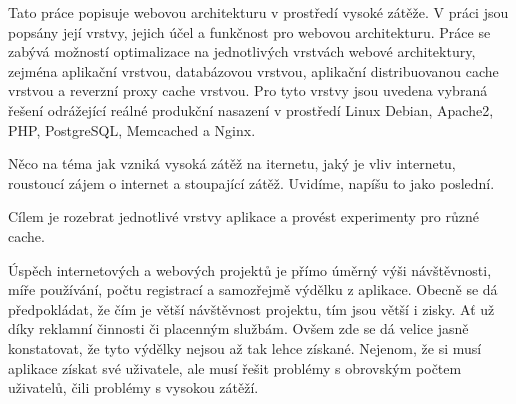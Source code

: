 \documentclass[12pt]{article}
\begin{document}



{Tato práce popisuje webovou architekturu v prostředí vysoké zátěže. V práci jsou popsány její vrstvy, jejich účel a funkčnost pro webovou architekturu. Práce se zabývá možností optimalizace na jednotlivých vrstvách webové architektury, zejména aplikační vrstvou, databázovou vrstvou, aplikační distribuovanou cache vrstvou a reverzní proxy cache vrstvou. Pro tyto vrstvy jsou uvedena vybraná řešení odrážející reálné produkční nasazení v prostředí Linux Debian, Apache2, PHP, PostgreSQL, Memcached a Nginx.}


\obsah
{}


Něco na téma jak vzniká vysoká zátěž na iternetu, jaký je vliv internetu, roustoucí zájem o internet a stoupající zátěž. Uvidíme, napíšu to jako poslední.

Cílem je rozebrat jednotlivé vrstvy aplikace a provést experimenty pro různé cache.

Úspěch internetových a webových projektů je přímo úměrný výši návštěvnosti, míře používání, počtu registrací a samozřejmě výdělku z aplikace. Obecně se dá předpokládat, že čím je větší návštěvnost projektu, tím jsou větší i zisky. Ať už díky reklamní činnosti či placenným službám. Ovšem zde se dá velice jasně konstatovat, že tyto výdělky nejsou až tak lehce získané. Nejenom, že si musí aplikace získat své uživatele, ale musí řešit problémy s obrovským počtem uživatelů, čili problémy s vysokou zátěží.
\end{document}
